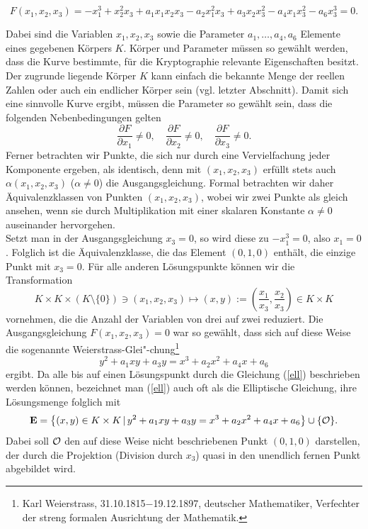 \begin{refsegment}
\begin{equation}
 F(x_1,x_2,x_3)=-x_1^3+x_2^2x_3+a_1x_1x_2x_3-a_2x_1^2x_3+a_3x_2x_3^2-a_4x_1x_3^2-a_6x_3^3=0.
\label{eccbasisgleichung}
\end{equation}

Dabei sind die Variablen $x_1,x_2,x_3$ sowie die Parameter $a_1,\dots,a_4,a_6$ Elemente
eines gegebenen Körpers $K$. Körper und Parameter müssen so gewählt werden, dass die Kurve bestimmte, für die Kryptographie relevante Eigenschaften besitzt. Der zugrunde liegende Körper $K$ kann einfach die bekannte Menge der reellen Zahlen oder auch ein endlicher Körper sein (vgl. letzter Abschnitt).
Damit sich eine sinnvolle Kurve ergibt, müssen die Parameter so gewählt sein, dass die folgenden Nebenbedingungen gelten
$$ \frac{\partial F}{\partial x_1}\ne 0, \quad \frac{\partial F}{\partial x_2}\ne 0, \quad
\frac{\partial F}{\partial x_3}\ne 0 .
$$
Ferner betrachten wir Punkte, die sich nur durch eine Vervielfachung jeder Komponente ergeben, als identisch, denn mit $(x_1,x_2,x_3)$ erfüllt stets auch $\alpha (x_1,x_2,x_3)$ ($\alpha\ne 0$) die Ausgangsgleichung. Formal betrachten wir daher Äquivalenzklassen von Punkten $(x_1,x_2,x_3)$, wobei wir zwei Punkte als gleich ansehen, wenn sie durch Multiplikation mit einer skalaren Konstante $\alpha \ne 0$ auseinander hervorgehen.
\\ Setzt man in der Ausgangsgleichung $x_3=0$, so wird diese zu $-x_1^3=0$, also $x_1=0$. Folglich ist die Äquivalenzklasse, die das Element $(0,1,0)$ enthält, die einzige Punkt mit $x_3=0$. Für alle anderen Lösungspunkte können wir die Transformation
$$ K\times K\times (K\setminus\{0\})\ni (x_1,x_2,x_3) \mapsto (x,y):=\left( \frac{x_1}{x_3}, \frac{x_2}{x_3}\right) \in K\times K
$$
vornehmen, die die Anzahl der Variablen von drei auf zwei reduziert.
Die Ausgangsgleichung $F(x_1,x_2,x_3)=0$ war so gewählt, dass sich auf
diese Weise die sogenannte Weierstrass-Glei"-chung\footnote{%
Karl Weierstrass, 31.10.1815$-$19.12.1897, deutscher Mathematiker,
Verfechter der streng formalen Ausrichtung der Mathematik.
}
\begin{equation}
 y^2+a_1xy+a_3y = x^3+a_2x^2+a_4x+a_6
\label{ell}
\end{equation}
ergibt.
Da alle bis auf einen Lösungspunkt durch die Gleichung (\ref{ell}) beschrieben werden können, bezeichnet man (\ref{ell}) auch oft als die Elliptische Gleichung, ihre Lösungsmenge folglich mit
$$ \textbf{E} = \left\{(x,y)\in K\times K \, |\, y^2+a_1xy+a_3y = x^3+a_2x^2+a_4x+a_6  \right\} \cup \{{\cal O} \}.
$$
Dabei soll ${\cal O}$ den auf diese Weise nicht beschriebenen Punkt $(0,1,0)$ darstellen, der durch die Projektion (Division durch $x_3$) quasi in den unendlich fernen Punkt abgebildet wird.


\end{refsegment}
